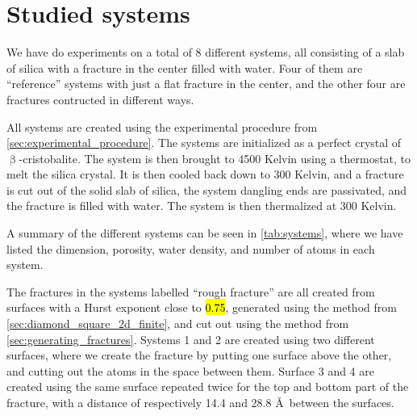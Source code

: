 \chapter{Studied systems}
%
%
%
We have do experiments on a total of 8 different systems, all consisting of a slab of silica with a fracture in the center filled with water. Four of them are ``reference'' systems with just a flat fracture in the center, and the other four are fractures contructed in different ways.

All systems are created using the experimental procedure from \cref{sec:experimental_procedure}. The systems are initialized as a perfect crystal of $\upbeta$-cristobalite. The system is then brought to 4500 Kelvin using a thermostat, to melt the silica crystal. It is then cooled back down to 300 Kelvin, and a fracture is cut out of the solid slab of silica, the system dangling ends are passivated, and the fracture is filled with water. The system is then thermalized at 300 Kelvin.

A summary of the different systems can be seen in \cref{tab:systems}, where we have listed the dimension, porosity, water density, and number of atoms in each system.

The fractures in the systems labelled ``rough fracture'' are all created from surfaces with a Hurst exponent close to \hl{0.75}, generated using the method from \cref{sec:diamond_square_2d_finite}, and cut out using the method from \cref{sec:generating_fractures}. Systems 1 and 2 are created using two different surfaces, where we create the fracture by putting one surface above the other, and cutting out the atoms in the space between them. Surface 3 and 4 are created using the same surface repeated twice for the top and bottom part of the fracture, with a distance of respectively 14.4 and 28.8 \AA\ between the surfaces.

